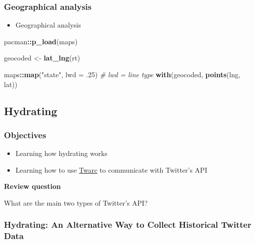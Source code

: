 \documentclass[
]{book}
\newenvironment{Shaded}{\begin{snugshade}}{\end{snugshade}}
\newcommand{\CommentTok}[1]{\textcolor[rgb]{0.56,0.35,0.01}{\textit{#1}}}
\newcommand{\DataTypeTok}[1]{\textcolor[rgb]{0.13,0.29,0.53}{#1}}
\newcommand{\FloatTok}[1]{\textcolor[rgb]{0.00,0.00,0.81}{#1}}
\newcommand{\KeywordTok}[1]{\textcolor[rgb]{0.13,0.29,0.53}{\textbf{#1}}}
\newcommand{\NormalTok}[1]{#1}
\newcommand{\OperatorTok}[1]{\textcolor[rgb]{0.81,0.36,0.00}{\textbf{#1}}}
\newcommand{\StringTok}[1]{\textcolor[rgb]{0.31,0.60,0.02}{#1}}
\providecommand{\tightlist}{%
  \setlength{\itemsep}{0pt}\setlength{\parskip}{0pt}}
\begin{document}
\hypertarget{geographical-analysis}{%
\subsubsection{Geographical analysis}\label{geographical-analysis}}

\begin{itemize}
\tightlist
\item
  Geographical analysis
\end{itemize}

\begin{Shaded}
\begin{Highlighting}[]
\NormalTok{pacman}\OperatorTok{::}\KeywordTok{p\_load}\NormalTok{(maps)}

\NormalTok{geocoded \textless{}{-}}\StringTok{ }\KeywordTok{lat\_lng}\NormalTok{(rt)}

\NormalTok{maps}\OperatorTok{::}\KeywordTok{map}\NormalTok{(}\StringTok{"state"}\NormalTok{, }\DataTypeTok{lwd =} \FloatTok{.25}\NormalTok{) }\CommentTok{\# lwd = line type }
\KeywordTok{with}\NormalTok{(geocoded, }\KeywordTok{points}\NormalTok{(lng, lat))}
\end{Highlighting}
\end{Shaded}

\hypertarget{hydrating}{%
\subsection{Hydrating}\label{hydrating}}

\hypertarget{objectives-5}{%
\subsubsection{Objectives}\label{objectives-5}}

\begin{itemize}
\tightlist
\item
  Learning how hydrating works
\item
  Learning how to use \href{https://github.com/DocNow/twarc}{Twarc} to communicate with Twitter's API
\end{itemize}

\textbf{Review question}

What are the main two types of Twitter's API?

\hypertarget{hydrating-an-alternative-way-to-collect-historical-twitter-data}{%
\subsubsection{Hydrating: An Alternative Way to Collect Historical Twitter Data}\label{hydrating-an-alternative-way-to-collect-historical-twitter-data}}
\end{document}
